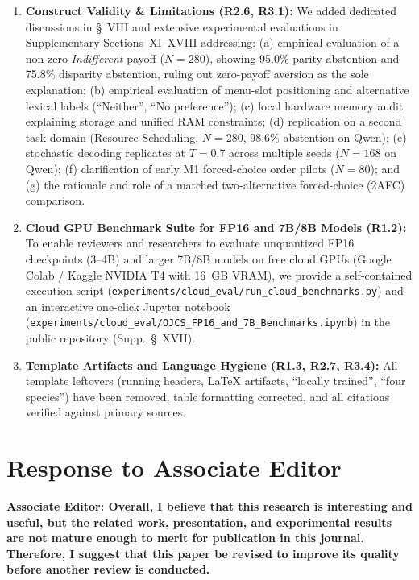 \documentclass[11pt]{article}
\newcommand{\reviewercomment}[1]{\vspace{1em}\noindent\textbf{\textcolor{commentcolor}{#1}}}
\begin{document}
\begin{enumerate}[leftmargin=*]
\item \textbf{Construct Validity \& Limitations (R2.6, R3.1):} We added dedicated discussions in \S~VIII and extensive experimental evaluations in Supplementary Sections~XI--XVIII addressing: (a) empirical evaluation of a non-zero \textit{Indifferent} payoff ($N=280$), showing 95.0\% parity abstention and 75.8\% disparity abstention, ruling out zero-payoff aversion as the sole explanation; (b) empirical evaluation of menu-slot positioning and alternative lexical labels (``Neither'', ``No preference''); (c) local hardware memory audit explaining storage and unified RAM constraints; (d) replication on a second task domain (Resource Scheduling, $N=280$, 98.6\% abstention on Qwen); (e) stochastic decoding replicates at $T=0.7$ across multiple seeds ($N=168$ on Qwen); (f) clarification of early M1 forced-choice order pilots ($N=80$); and (g) the rationale and role of a matched two-alternative forced-choice (2AFC) comparison.
\item \textbf{Cloud GPU Benchmark Suite for FP16 and 7B/8B Models (R1.2):} To enable reviewers and researchers to evaluate unquantized FP16 checkpoints (3--4B) and larger 7B/8B models on free cloud GPUs (Google Colab / Kaggle NVIDIA T4 with 16~GB VRAM), we provide a self-contained execution script (\texttt{experiments/cloud\_eval/run\_cloud\_benchmarks.py}) and an interactive one-click Jupyter notebook (\texttt{experiments/cloud\_eval/OJCS\_FP16\_and\_7B\_Benchmarks.ipynb}) in the public repository (Supp.~\S~XVII).
\item \textbf{Template Artifacts and Language Hygiene (R1.3, R2.7, R3.4):} All template leftovers (running headers, LaTeX artifacts, ``locally trained'', ``four species'') have been removed, table formatting corrected, and all citations verified against primary sources.
\end{enumerate}

\section*{Response to Associate Editor}

\reviewercomment{Associate Editor: Overall, I believe that this research is interesting and useful, but the related work, presentation, and experimental results are not mature enough to merit for publication in this journal. Therefore, I suggest that this paper be revised to improve its quality before another review is conducted.}
\end{document}
